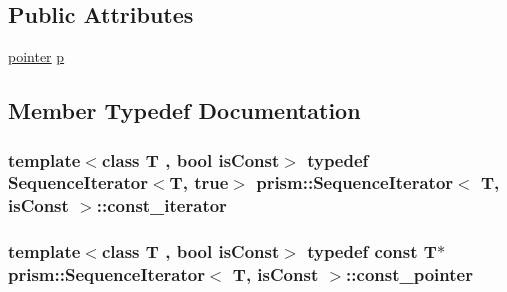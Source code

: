 \subsection*{Public Attributes}
\begin{DoxyCompactItemize}
\item 
\hyperlink{structprism_1_1_sequence_iterator_aba1344ee0e1c4be6658f8a3413c66df2}{pointer} \hyperlink{structprism_1_1_sequence_iterator_aea1d104b7fda3ca8899fefa896fa59e6}{p}
\end{DoxyCompactItemize}


\subsection{Member Typedef Documentation}
\subsubsection[{\texorpdfstring{const\+\_\+iterator}{const_iterator}}]{\setlength{\rightskip}{0pt plus 5cm}template$<$class T , bool is\+Const$>$ typedef {\bf Sequence\+Iterator}$<$T, true$>$ {\bf prism\+::\+Sequence\+Iterator}$<$ T, is\+Const $>$\+::{\bf const\+\_\+iterator}}\hypertarget{structprism_1_1_sequence_iterator_a8be80243dfbbc36132e108a7858eafd0}{}\label{structprism_1_1_sequence_iterator_a8be80243dfbbc36132e108a7858eafd0}
\subsubsection[{\texorpdfstring{const\+\_\+pointer}{const_pointer}}]{\setlength{\rightskip}{0pt plus 5cm}template$<$class T , bool is\+Const$>$ typedef const T$\ast$ {\bf prism\+::\+Sequence\+Iterator}$<$ T, is\+Const $>$\+::{\bf const\+\_\+pointer}}\hypertarget{structprism_1_1_sequence_iterator_a4c3367cd1e3aacc1cd902bab256ee6b2}{}\label{structprism_1_1_sequence_iterator_a4c3367cd1e3aacc1cd902bab256ee6b2}
